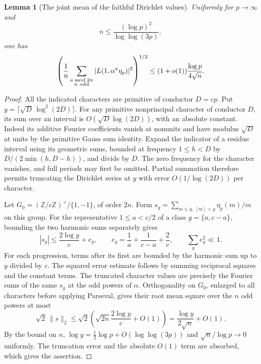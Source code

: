 \documentclass[a4paper,11pt]{article}
\newtheorem{lemma}[proposition]{Lemma}
\theoremstyle{definition}
\theoremstyle{remark}
\numberwithin{equation}{section}
\begin{document}
\begin{lemma}[The joint mean of the faithful Dirichlet values]
\leavevmode\label{lem:jointLvalues529}
Uniformly for \(p\to\infty\) and
\[
                   n\le\frac{(\log p)^2}{\log\log(3p)},
\]
one has
\[
 \left(\frac1n
    \sum_{\substack{a\bmod 2n\\a\ {\rm odd}}}
    |L(1,\alpha^a\eta_p)|^2\right)^{1/2}
    \le (1+o(1))\frac{\log p}{4\sqrt n}.
\]
\end{lemma}
\begin{proof}
All the indicated characters are primitive of conductor \(D=cp\).
Put \(y=\lceil\sqrt D\,\log^2(2D)\rceil\). For any primitive
nonprincipal character of conductor \(D\), its sum over an interval
is \(O(\sqrt D\log(2D))\), with an absolute constant. Indeed its
additive Fourier coefficients vanish at nonunits and have modulus
\(\sqrt D\) at units by the primitive Gauss sum identity. Expand the
indicator of a residue interval using its geometric sums, bounded
at frequency \(1\le h<D\) by \(D/(2\min(h,D-h))\), and divide by
\(D\). The zero frequency for the character vanishes, and full
periods may first be omitted. Partial summation therefore permits
truncating the Dirichlet series at \(y\) with error
\(O(1/\log(2D))\) per character.

Let \(G_0=(\mathbb Z/c\mathbb Z)^\times/\{1,-1\}\), of order
\(2n\). Form \(s_g=\sum_{m\le y,\ [m]=g}\eta_p(m)/m\) on
this group. For the representative \(1\le a<c/2\) of a class
\(g=\{a,c-a\}\), bounding the two harmonic sums separately gives
\[
 |s_g|\le \frac{2\log y}{c}+e_g,\qquad
 e_g=\frac1a+\frac1{c-a}+\frac2c,\qquad
                         \sum_g e_g^2\ll 1 .
\]
For each progression, terms after its first are bounded by the
harmonic sum up to \(y\) divided by \(c\). The squared error estimate
follows by summing reciprocal squares and the constant terms.
The truncated character values are precisely the Fourier sums of
the same \(s_g\) at the odd powers of \(\alpha\).
Orthogonality on \(G_0\), enlarged to all characters before applying
Parseval, gives their root mean square over the \(n\) odd powers at
most
\[
    \sqrt 2\,\|s\|_2\le
       \sqrt 2\left(\sqrt{2n}\frac{2\log y}{c}+O(1)\right)
                  =\frac{\log y}{2\sqrt n}+O(1).
\]
By the bound on \(n\),
\(\log y=\frac12\log p+O(\log\log(3p))\) and
\(\sqrt n/\log p\to0\) uniformly. The truncation error and the
absolute \(O(1)\) term are absorbed, which gives the assertion.
\end{proof}
\end{document}
